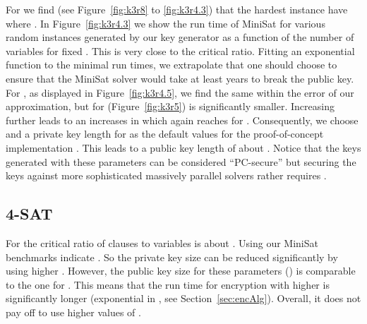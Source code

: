 \documentclass[final,journal,compsoc]{IEEEtran}
\begin{document}
For  we find (see Figure~\ref{fig:k3r8} to \ref{fig:k3r4.3})
that the hardest instance have  where  \cite{Kirkpatrick1994}.  In Figure~\ref{fig:k3r4.3} we show the
run time of MiniSat for various random instances generated by our key
generator as a function of the number of variables for fixed
. This is very close to the critical ratio. Fitting an
exponential function to the minimal run times, we extrapolate that one
should choose  to ensure that the MiniSat solver
would take at least  years to break the public key. For ,
as displayed in Figure~\ref{fig:k3r4.5}, we find the same 
within the error of our approximation, but for 
(Figure~\ref{fig:k3r5})  is significantly
smaller.  Increasing  further leads to an increases in  which
again reaches  for .
Consequently, we choose  and a private key length
 for  as the default values for the 
 proof-of-concept implementation \cite{code}. 
This leads to a public key length of about . Notice that the keys
generated with these parameters can be considered ``PC-secure'' but
securing the keys against more sophisticated massively parallel
solvers rather requires .





\subsection{4-SAT}

For  the critical ratio of clauses to variables is about
. Using  our MiniSat benchmarks indicate
. So the private key size can be reduced
significantly by using higher . However, the public key size for these
parameters () is comparable to the one for .
This means that the run time for encryption with higher  is significantly longer
(exponential in , see Section~\ref{sec:encAlg}).
Overall, it does not pay off to use higher values of .
\end{document}
